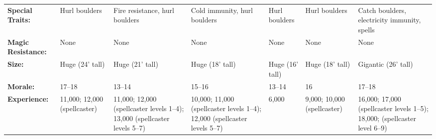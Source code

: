 \begin{minipage}{\columnwidth}
\begin{tabular}{p{}g{.11\columnwidth}p{.108\columnwidth}g{.11\columnwidth}p{.108\columnwidth}g{.11\columnwidth}p{.11\columnwidth}}
\textbf{Special Traits:} & Hurl boulders	& Fire resistance, hurl boulders	& Cold immunity, hurl boulders	& Hurl boulders	& Hurl boulders	& Catch boulders, electricity immunity, spells	\\
\textbf{Magic Resistance:} 	& None	& None	& None	& None	& None	& None	\\
\textbf{Size:} 				& Huge (24' tall)	& Huge (21' tall)	& Huge (18' tall)	& Huge (16' tall)	& Huge (18' tall)	& Gigantic (26' tall)	\\
\textbf{Morale:} 			& 17--18	& 13--14	& 15--16	& 13--14	& 16	& 17--18	\\
\textbf{Experience:} 		& 11,000; 12,000 (spellcaster) 	& 11,000; 12,000 (spellcaster levels 1--4); 13,000 (spellcaster levels 5--7) 	& 10,000; 11,000 (spellcaster levels 1--4); 12,000 (spellcaster levels 5--7)	& 6,000	& 9,000; 10,000 (spellcaster)	& 16,000; 17,000 (spellcaster levels 1--5); 18,000; (spellcaster level 6--9)	\\ %
\end{tabular}

\end{minipage}

